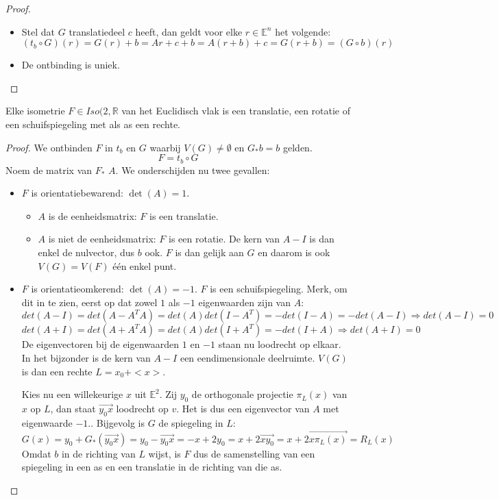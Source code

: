 \documentclass[main.tex]{subfiles}
\begin{document}
\begin{st}
\begin{proof}
\begin{itemize}
  \item Stel dat $G$ translatiedeel $c$ heeft, dan geldt voor elke $r\in \mathbb{E}^{n}$ het volgende:
    \[ (t_{b}\circ G)(r) = G(r) + b = Ar + c + b = A(r+b)+c = G(r+b) = (G\circ b)(r) \]

  \item De ontbinding is uniek.
  \end{itemize}

  \end{proof}
\end{st}

\begin{st}
  Elke isometrie $F\in Iso(2,\mathbb{R}$ van het Euclidisch vlak is een translatie, een rotatie of een schuifspiegeling met als as een rechte.

  \begin{proof}
    We ontbinden $F$ in $t_{b}$ en $G$ waarbij $V(G) \neq \emptyset$ en $G_{*}b = b$ gelden.
    \[F = t_{b} \circ G\]
    Noem de matrix van $F_{*}$ $A$.
    We onderschijden nu twee gevallen:
    \begin{itemize}
    \item $F$ is orientatiebewarend: $\det(A) = 1$.
      \begin{itemize}
      \item $A$ is de eenheidsmatrix: $F$ is een translatie.
      \item $A$ is niet de eenheidsmatrix: $F$ is een rotatie.
        De kern van $A-I$ is dan enkel de nulvector\waarom , dus $b$ ook.
        $F$ is dan gelijk aan $G$ en daarom is ook $V(G) = V(F)$ \'e\'en enkel punt.
      \end{itemize}
    \item $F$ is orientatieomkerend: $\det(A) = -1$.
      $F$ is een schuifspiegeling.
      Merk, om dit in te zien, eerst op dat zowel $1$ als $-1$ eigenwaarden zijn van $A$:
      \[ det(A-I) = det(A-A^{T}A) = det(A)det(I-A^{T}) = -det(I-A) = -det(A-I) \Rightarrow det(A-I) = 0 \]
      \[ det(A+I) = det(A+A^{T}A) = det(A)det(I+A^{T}) = -det(I+A) \Rightarrow det(A+I) = 0 \]
      De eigenvectoren bij de eigenwaarden $1$ en $-1$ staan nu loodrecht op elkaar.\waarom
      In het bijzonder is de kern van $A-I$ een eendimensionale deelruimte.
      $V(G)$ is dan een rechte $L=x_{0}+<x>$.\waarom

      Kies nu een willekeurige $x$ uit $\mathbb{E}^{2}$.
      Zij $y_{0}$ de orthogonale projectie $\pi_{L}(x)$ van $x$ op $L$, dan staat $\overrightarrow{y_{0}x}$ loodrecht op $v$.
      Het is dus een eigenvector van $A$ met eigenwaarde $-1$.\waarom.
      Bijgevolg is $G$ de spiegeling in $L$:
      \[ G(x) = y_{0} + G_{*}(\overrightarrow{y_{0}x}) = y_{0} - \overrightarrow{y_{0}x} = -x + 2y_{0} = x + 2\overrightarrow{xy_{0}} = x+2\overrightarrow{x\pi_{L}(x)} = R_{L}(x) \]
      Omdat $b$ in de richting van $L$ wijst, is $F$ dus de samenstelling van een spiegeling in een as en een translatie in de richting van die as.
    \end{itemize}
  \end{proof}
\end{st}
\end{document}
